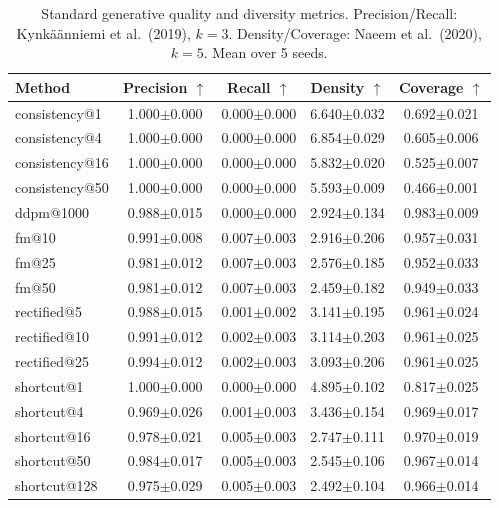 \begin{table}[t]
\centering
\caption{Standard generative quality and diversity metrics. Precision/Recall: Kynk\"a\"anniemi et al.\ (2019), $k{=}3$. Density/Coverage: Naeem et al.\ (2020), $k{=}5$. Mean over 5 seeds.}
\label{tab:precision_recall}
\footnotesize
\begin{tabular}{lcccc}
\toprule
Method & Precision $\uparrow$ & Recall $\uparrow$ & Density $\uparrow$ & Coverage $\uparrow$ \\
\midrule
  consistency@1 & 1.000$\pm$0.000 & 0.000$\pm$0.000 & 6.640$\pm$0.032 & 0.692$\pm$0.021 \\
  consistency@4 & 1.000$\pm$0.000 & 0.000$\pm$0.000 & 6.854$\pm$0.029 & 0.605$\pm$0.006 \\
  consistency@16 & 1.000$\pm$0.000 & 0.000$\pm$0.000 & 5.832$\pm$0.020 & 0.525$\pm$0.007 \\
  consistency@50 & 1.000$\pm$0.000 & 0.000$\pm$0.000 & 5.593$\pm$0.009 & 0.466$\pm$0.001 \\
  ddpm@1000 & 0.988$\pm$0.015 & 0.000$\pm$0.000 & 2.924$\pm$0.134 & 0.983$\pm$0.009 \\
  fm@10 & 0.991$\pm$0.008 & 0.007$\pm$0.003 & 2.916$\pm$0.206 & 0.957$\pm$0.031 \\
  fm@25 & 0.981$\pm$0.012 & 0.007$\pm$0.003 & 2.576$\pm$0.185 & 0.952$\pm$0.033 \\
  fm@50 & 0.981$\pm$0.012 & 0.007$\pm$0.003 & 2.459$\pm$0.182 & 0.949$\pm$0.033 \\
  rectified@5 & 0.988$\pm$0.015 & 0.001$\pm$0.002 & 3.141$\pm$0.195 & 0.961$\pm$0.024 \\
  rectified@10 & 0.991$\pm$0.012 & 0.002$\pm$0.003 & 3.114$\pm$0.203 & 0.961$\pm$0.025 \\
  rectified@25 & 0.994$\pm$0.012 & 0.002$\pm$0.003 & 3.093$\pm$0.206 & 0.961$\pm$0.025 \\
  shortcut@1 & 1.000$\pm$0.000 & 0.000$\pm$0.000 & 4.895$\pm$0.102 & 0.817$\pm$0.025 \\
  shortcut@4 & 0.969$\pm$0.026 & 0.001$\pm$0.003 & 3.436$\pm$0.154 & 0.969$\pm$0.017 \\
  shortcut@16 & 0.978$\pm$0.021 & 0.005$\pm$0.003 & 2.747$\pm$0.111 & 0.970$\pm$0.019 \\
  shortcut@50 & 0.984$\pm$0.017 & 0.005$\pm$0.003 & 2.545$\pm$0.106 & 0.967$\pm$0.014 \\
  shortcut@128 & 0.975$\pm$0.029 & 0.005$\pm$0.003 & 2.492$\pm$0.104 & 0.966$\pm$0.014 \\
\bottomrule
\end{tabular}
\end{table}